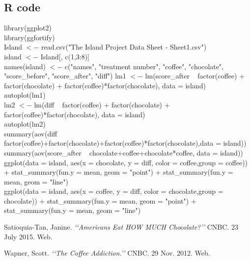 \documentclass[12pt]{article}
\begin{document}
\begin{flushleft}
\section{R code}
\bigskip
library(ggplot2)
\\library(ggfortify)
\bigskip
\\Island $<-$ read.csv("The Island Project Data Sheet - Sheet1.csv")
\\island $<-$ Island[, c(1,3:8)]        
\\names(island) $<-$ c("names", "treatment number", "coffee", "chocolate", "score\_before", "score\_after", "diff")
\bigskip
lm1 $<-$ lm(score\_after ~ factor(coffee) + factor(chocolate) + factor(coffee)*factor(chocolate), data = island)
\\autoplot(lm1)
\bigskip
\\lm2 $<-$ lm(diff ~ factor(coffee) + factor(chocolate) + factor(coffee)*factor(chocolate), data = island)
\\autoplot(lm2) 
\bigskip
\\summary(aov(diff ~ factor(coffee)+factor(chocolate)+factor(coffee)*factor(chocolate),data = island))
\\summary(aov(score\_after ~ chocolate+coffee+chocolate*coffee, data = island))
\bigskip
\\ggplot(data = island, aes(x = chocolate, y = diff, color = coffee,group = coffee)) +
  stat\_summary(fun.y = mean, geom = "point") +
  stat\_summary(fun.y = mean, geom = "line") 
\bigskip
\\ggplot(data = island, aes(x = coffee, y = diff, color = chocolate,group = chocolate)) +
  stat\_summary(fun.y = mean, geom = "point") +
  stat\_summary(fun.y = mean, geom = "line") 
\bigskip
\begin{thebibliography}{9}
 Satioquia-Tan, Janine.
\textit{\lq\lq Americans Eat HOW MUCH Chocolate?\rq\rq}
CNBC. 23 July 2015. Web.
 
 Wapner, Scott.
\textit{\lq\lq The Coffee Addiction.\rq\rq} 
CNBC. 29 Nov. 2012. Web. 
\end{thebibliography}
\end{flushleft}
\end{document}
